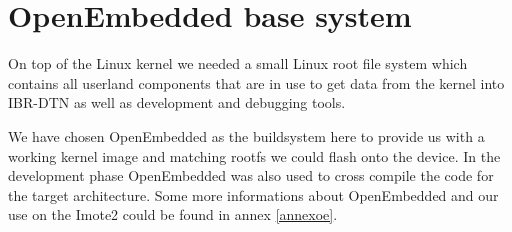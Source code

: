 \section{OpenEmbedded base system}
On top of the Linux kernel we needed a small Linux root file system which
contains all userland components that are in use to get data from the kernel
into IBR-DTN as well as development and debugging tools.

We have chosen OpenEmbedded as the buildsystem here to provide us with a working
kernel image and matching rootfs we could flash onto the device. In the
development phase OpenEmbedded was also used to cross compile the code for the
target architecture. Some more informations about OpenEmbedded and our use on the
Imote2 could be found in annex \ref{annexoe}.

